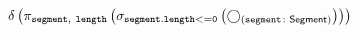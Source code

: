 \documentclass[varwidth=100cm,convert={density=120}]{standalone}
\begin{document}
\begin{preview}
$\duplicateelimination \left(\projection{\var{segment},~\var{length}} \left(\selection{\mathtt{segment.length <= 0}} \left(\getvertices{segment}{Segment}\right)\right)\right)$
\end{preview}
\end{document}
